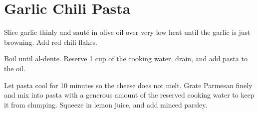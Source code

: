 \section{Garlic Chili Pasta}
\begin{recipe}



Slice garlic thinly and sauté in olive oil over very low heat until the garlic is just browning. Add red chili flakes.


Boil until al-dente. Reserve 1 cup of the cooking water, drain, and add pasta to the oil.



Let pasta cool for 10 minutes so the cheese does not melt.
Grate Parmesan finely and mix into pasta with a generous amount of the reserved cooking water to keep it from clumping.
Squeeze in lemon juice, and add minced parsley.

\end{recipe}
